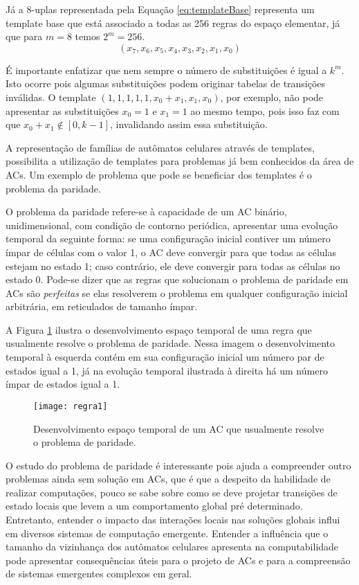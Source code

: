 Já a $8$-uplas representada pela Equação \ref{eq:templateBase} representa um template base que está associado a todas as 256 regras do espaço elementar, já que para $m = 8$ temos $2^m = 256 $.
\begin{equation}
(x_7,x_6,x_5,x_4,x_3,x_2,x_1,x_0)
\label{eq:templateBase}
\end{equation}

É importante enfatizar que nem sempre o número de substituições é igual a $k^m$. Isto ocorre pois algumas substituições podem originar tabelas de transições inválidas. O template $(1,1,1,1,1,x_0+x_1,x_1,x_0)$, por exemplo, não pode apresentar as substituições $x_0=1$ e $x_1=1$ ao mesmo tempo, pois isso faz com que $x_0 + x_1 \notin [0, k-1]$, invalidando assim essa substituição.




A representação de famílias de autômatos celulares através de templates, possibilita a utilização de templates para problemas já bem conhecidos da área de ACs. Um exemplo de problema que pode se beneficiar dos templates é o problema da paridade.

O problema da paridade refere-se à capacidade de um AC binário, unidimensional, com condição de contorno periódica, apresentar uma evolução temporal da seguinte forma: se uma configuração inicial contiver um número ímpar de células com o valor 1, o AC deve convergir para que todas as células estejam no estado 1; caso contrário, ele deve convergir para todas as células no estado 0. Pode-se dizer que as regras que solucionam o problema de paridade em ACs são \textit{perfeitas} se elas resolverem o problema em qualquer configuração inicial arbitrária, em reticulados de tamanho ímpar. 

A Figura \ref{fig:parity-rule} ilustra o desenvolvimento espaço temporal de uma regra que usualmente resolve o problema de paridade. Nessa imagem o desenvolvimento temporal à esquerda contém em sua configuração inicial um número par de estados igual a 1, já na evolução temporal ilustrada à direita há um número ímpar de estados igual a 1.

\begin{figure}[h!]
  \centering
  \texttt{[image: regra1]}
    \caption{Desenvolvimento espaço temporal de um AC que usualmente resolve o problema de paridade.}
    \label{fig:parity-rule}
\end{figure}


O estudo do problema de paridade é interessante pois ajuda a compreender outro problemas ainda sem solução em ACs, que é que a despeito da habilidade de realizar computações, pouco se sabe sobre como se deve projetar transições de estado locais que levem a um comportamento global pré determinado. Entretanto, entender o impacto das interações locais nas soluções globais influi em diversos sistemas de computação emergente. Entender a influência que o tamanho da vizinhança dos autômatos celulares apresenta na computabilidade pode apresentar consequências úteis para o projeto de ACs e para a compreensão de sistemas emergentes complexos em geral.

